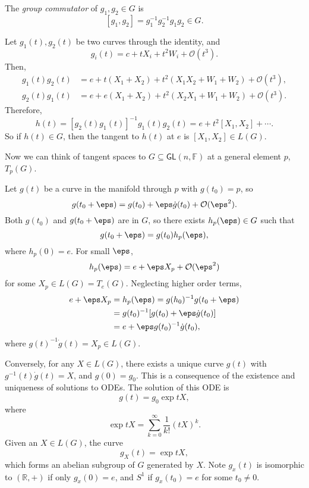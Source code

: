 \documentclass[12pt]{article}
\begin{document}
\begin{definition}
	The \emph{group commutator} of $g_1, g_2 \in G$ is
	\[
		[g_1, g_2] = g_1^{-1} g_2^{-1} g_1 g_2 \in G.
	\]
\end{definition}

Let $g_1(t), g_2(t)$ be two curves through the identity, and
\[
g_i(t) = c + t X_i + t^2 W_i + \mathcal{O}(t^3).
\]
Then,
\begin{align*}
	g_1(t) g_2(t) &= e + t(X_1 + X_2) + t^2(X_1 X_2 + W_1 + W_2) + \mathcal{O}(t^3), \\
	g_2(t) g_1(t) &= e + e(X_1 + X_2) + t^2(X_2 X_1 + W_1 + W_2) + \mathcal{O}(t^3).
\end{align*}
Therefore,
\[
	h(t) = [g_2(t)g_1(t)]^{-1} g_1(t) g_2(t) = e + t^2[X_1, X_2] + \cdots.
\]
So if $h(t) \in G$, then the tangent to $h(t)$ at $e$ is $[X_1, X_2] \in L(G)$.

Now we can think of tangent spaces to $G \subseteq \mathsf{GL}(n, \mathbb{F})$ at a general element $p$, $T_p(G)$.

Let $g(t)$ be a curve in the manifold through $p$ with $g(t_0) = p$, so
\[
g(t_0 + \eps) = g(t_0) + \eps \dot g (t_0) + \mathcal{O}(\eps^2).
\]
Both $g(t_0)$ and $g(t_0 + \eps)$ are in $G$, so there exists $h_p(\eps) \in G$ such that
\[
g(t_0 + \eps) = g(t_0) h_p(\eps),
\]
where $h_p(0) = e$. For small $\eps$,
\[
h_p(\eps) = e + \eps X_p + \mathcal{O}(\eps^2)
\]
for some $X_p \in L(G) = T_e(G)$. Neglecting higher order terms,
\begin{align*}
	e + \eps X_p &= h_p(\eps) = g(h_0)^{-1} g(t_0 + \eps) \\
		     &= g(t_0)^{-1} [g(t_0) + \eps \dot g (t_0)] \\
		     &= e + \eps g(t_0)^{-1} \dot g(t_0),
\end{align*}
where $g(t)^{-1} \dot g(t) = X_p \in L(G)$.

Conversely, for any $X \in L(G)$, there exists a unique curve $g(t)$ with $g^{-1}(t) \dot g(t) = X$, and $g(0) = g_0$. This is a consequence of the existence and uniqueness of solutions to ODEs. The solution of this ODE is
\[
g(t) = g_0 \exp tX,
\]
where
\[
\exp tX = \sum_{k = 0}^\infty \frac{1}{k!} (tX)^k.
\]
Given an $X \in L(G)$, the curve
\[
g_X(t) = \exp tX,
\]
which forms an abelian subgroup of $G$ generated by $X$. Note $g_x(t)$ is isomorphic to $(\mathbb{R}, +)$ if only $g_x(0)=  e$, and $S^1$ if $g_x(t_0) = e$ for some $t_0 \neq 0$.


\newpage

\printindex
\end{document}
